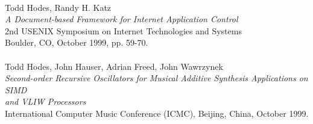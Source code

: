 \begin{tabbing}
\smallskip \\[-3pt]
\>    Todd Hodes, Randy H. Katz \\
\>\>      {\it A Document-based Framework for Internet Application Control} \\
\>\>       2nd USENIX Symposium on Internet Technologies and Systems \\
\>\>       Boulder, CO, October 1999, pp. 59-70. \\
\smallskip \\[-3pt]

\>    Todd Hodes, John Hauser, Adrian Freed, John Wawrzynek \\
\>\>      {\it Second-order Recursive Oscillators for Musical Additive Synthesis Applications on SIMD } \\
\>\>      {\it  and VLIW Processors} \\
\>\>       International Computer Music Conference (ICMC), Beijing, China, October 1999. \\



\end{tabbing}
